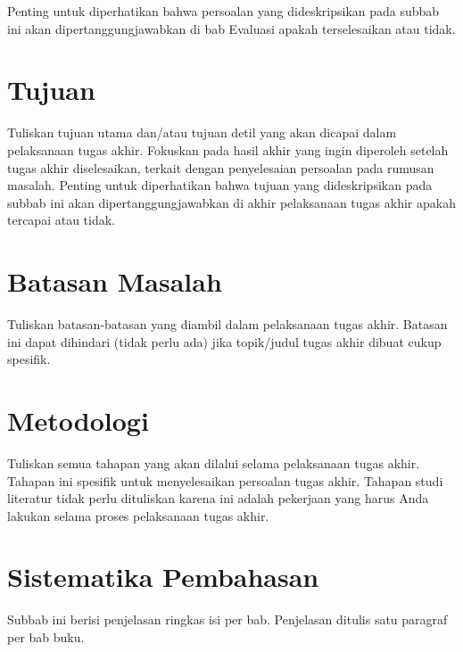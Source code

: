 Penting untuk diperhatikan bahwa persoalan yang dideskripsikan pada subbab ini akan dipertanggungjawabkan di bab Evaluasi apakah terselesaikan atau tidak.

\blindtext%

\section{Tujuan}

Tuliskan tujuan utama dan/atau tujuan detil yang akan dicapai dalam pelaksanaan tugas akhir. Fokuskan pada hasil akhir yang ingin diperoleh setelah tugas akhir diselesaikan, terkait dengan penyelesaian persoalan pada rumusan masalah. Penting untuk diperhatikan bahwa tujuan yang dideskripsikan pada subbab ini akan dipertanggungjawabkan di akhir pelaksanaan tugas akhir apakah tercapai atau tidak.

\blindtext%

\section{Batasan Masalah}

Tuliskan batasan-batasan yang diambil dalam pelaksanaan tugas akhir. Batasan ini dapat dihindari (tidak perlu ada) jika topik/judul tugas akhir dibuat cukup spesifik.

\blindtext%

\section{Metodologi}

Tuliskan semua tahapan yang akan dilalui selama pelaksanaan tugas akhir. Tahapan ini spesifik untuk menyelesaikan persoalan tugas akhir. Tahapan studi literatur tidak perlu dituliskan karena ini adalah pekerjaan yang harus Anda lakukan selama proses pelaksanaan tugas akhir.

\blindtext%

\section{Sistematika Pembahasan}

Subbab ini berisi penjelasan ringkas isi per bab. Penjelasan ditulis satu paragraf per bab buku.

\blindtext%
